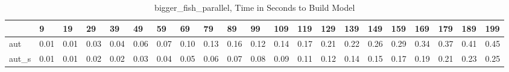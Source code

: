 \begin{table}
\caption{bigger_fish_parallel, Time in Seconds to Build Model}
\label{bigger_fish_parallel_model_time}
\begin{tabular}{lllllllllllllllllllll}
\toprule
 & 9 & 19 & 29 & 39 & 49 & 59 & 69 & 79 & 89 & 99 & 109 & 119 & 129 & 139 & 149 & 159 & 169 & 179 & 189 & 199 \\
\midrule
aut & 0.01 & 0.01 & 0.03 & 0.04 & 0.06 & 0.07 & 0.10 & 0.13 & 0.16 & 0.12 & 0.14 & 0.17 & 0.21 & 0.22 & 0.26 & 0.29 & 0.34 & 0.37 & 0.41 & 0.45 \\
aut_s & 0.01 & 0.01 & 0.02 & 0.02 & 0.03 & 0.04 & 0.05 & 0.06 & 0.07 & 0.08 & 0.09 & 0.11 & 0.12 & 0.14 & 0.15 & 0.17 & 0.19 & 0.21 & 0.23 & 0.25 \\
\bottomrule
\end{tabular}
\end{table}
